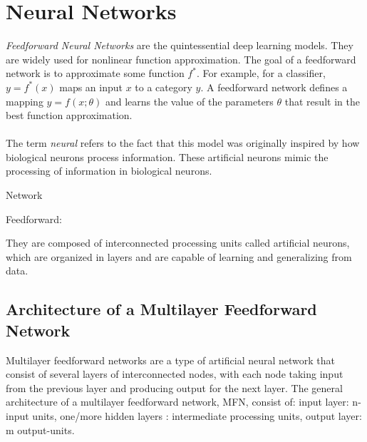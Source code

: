 \documentclass[../main.tex]{subfiles}
\begin{document}
	\chapter{Neural Networks} \label{ch:neural}
	
\noindent \textit{Feedforward Neural Networks} are the quintessential deep learning models. They are widely used for nonlinear function approximation. The goal of a feedforward network is to approximate some function $f^*$. For example, for a classifier, $y = f^*(x)$ maps an input $x$ to a category $y$. A feedforward network defines a mapping $y = f(x;\theta)$ and learns the value of the parameters $\theta$ that result in the best function approximation. \\ \\ 
\noindent The term \textit{neural} refers  to the fact that this model was originally inspired by how biological neurons process information. These artificial neurons mimic the processing of information in biological neurons. 

Network 

Feedforward: 
	
	
	
	They are composed of interconnected processing units called artificial neurons, which are organized in layers and are capable of learning and generalizing from data.	
	
	\section{Architecture of a Multilayer Feedforward Network}
	\noindent Multilayer feedforward networks are a type of artificial neural network that consist of several layers of interconnected nodes, with each node taking input from the previous layer and producing output for the next layer. The general architecture of a multilayer feedforward network, MFN, consist of: input layer: n-input units,  one/more hidden layers : intermediate processing units, output layer: m output-units. 
	
\end{document}

